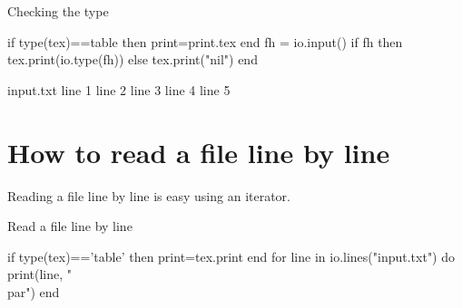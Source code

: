 \begin{texexample}{Checking the type}{}
\begin{luacode}
if type(tex)==table then print=print.tex end
fh = io.input()
if fh then
    tex.print(io.type(fh)) 
  else
    tex.print("nil")
end
\end{luacode}
\end{texexample} 

 
\begin{filecontents*}{input.txt}
line 1
line 2
line 3
line 4
line 5
\end{filecontents*}


\section*{How to read a file line by line}

Reading a file line by line is easy using an iterator.

\begin{texexample}{Read a file line by line}{}
\begin{luacode}
if type(tex)=='table' then print=tex.print end
for line in io.lines("input.txt") do
  print(line, "\\par")
end
\end{luacode}
\end{texexample}
\endinput

\section{A more practical example}
In the sections of the documentation, where we describe
the use of unicode for scripts, we provide files with almost
all unicode blocks we describe. For example the file
|hieroglyphics.txt| provides the details for the first
hieroglyphic characters |U+13000-130FF|.

This is parsed using \tex, but could equally well and perhaps easier and more robustly be parsed using Lua.  


\begin{texexample}{Reading a file line by line}{}
\begin{luacode*}
filename = "./languages/hieroglyphics.txt"
fp = io.open( filename, "r" )
for line in fp:lines() do
    tex.print(line..", ")
   end
fp:close()
\end{luacode*}
\end{texexample}

In the second example, we start building our programme
by defining functions to get a glyph using a particular font
command and to typeset it.


